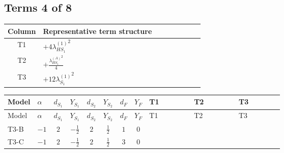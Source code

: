 \documentclass[8pt]{article}
\begin{document}
\begin{landscape}
\subsection*{Terms 4 of 8}
\begin{center}
\begin{tabular}{@{}c >{\raggedright\arraybackslash}p{0.82\linewidth}@{}}
\toprule
Column & Representative term structure \\
\midrule
T1 & \(\displaystyle +4 {\lambda_{HS_1}^{(1)}}^2\) \\
\midrule
T2 & \(\displaystyle +\frac{{\lambda_{HS_1}^{(A)}}^2}{4}\) \\
\midrule
T3 & \(\displaystyle +12 {\lambda_{S_1}^{(1)}}^2\) \\
\midrule
\bottomrule
\end{tabular}
\end{center}
\smallskip
\tiny
\begin{longtable}{@{}llcccccc >{\raggedright\arraybackslash}p{0.21\linewidth} >{\raggedright\arraybackslash}p{0.21\linewidth} >{\raggedright\arraybackslash}p{0.21\linewidth}@{}}
\toprule
Model & $\alpha$ & $d_{S_1}$ & $Y_{S_1}$ & $d_{S_2}$ & $Y_{S_2}$ & $d_F$ & $Y_F$ & T1 & T2 & T3 \\
\midrule
\endfirsthead
\toprule
Model & $\alpha$ & $d_{S_1}$ & $Y_{S_1}$ & $d_{S_2}$ & $Y_{S_2}$ & $d_F$ & $Y_F$ & T1 & T2 & T3 \\
\midrule
\endhead
T3-B & $-1$ & $2$ & $-\frac{1}{2}$ & $2$ & $\frac{1}{2}$ & $1$ & $0$ & \scriptsize\adjustbox{max width=\linewidth}{$\begin{gathered} +4 {\lambda_{HS_1}^{(1)}}^2\end{gathered}$} & \scriptsize\adjustbox{max width=\linewidth}{$\begin{gathered} +\frac{{\lambda_{HS_1}^{(A)}}^2}{4}\end{gathered}$} & \scriptsize\adjustbox{max width=\linewidth}{$\begin{gathered} +12 {\lambda_{S_1}^{(1)}}^2\end{gathered}$} \\
\midrule
T3-C & $-1$ & $2$ & $-\frac{1}{2}$ & $2$ & $\frac{1}{2}$ & $3$ & $0$ & \scriptsize\adjustbox{max width=\linewidth}{$\begin{gathered} +4 {\lambda_{HS_1}^{(1)}}^2\end{gathered}$} & \scriptsize\adjustbox{max width=\linewidth}{$\begin{gathered} +\frac{{\lambda_{HS_1}^{(A)}}^2}{4}\end{gathered}$} & \scriptsize\adjustbox{max width=\linewidth}{$\begin{gathered} +12 {\lambda_{S_1}^{(1)}}^2\end{gathered}$} \\

\end{longtable}
\end{landscape}
\end{document}
